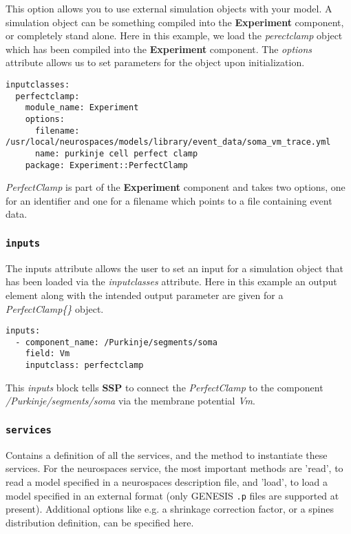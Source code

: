 \documentclass[12pt]{article}
\begin{document}
This option allows you to use external simulation objects with your model. A simulation object can be something compiled into the {\bf Experiment} component, or completely stand alone. Here in this example, we load the {\it perectclamp} object which has been compiled into the {\bf Experiment} component. The {\it options} attribute allows us to set parameters for the object upon initialization. 

\begin{verbatim}
inputclasses:
  perfectclamp:
    module_name: Experiment
    options:
      filename: /usr/local/neurospaces/models/library/event_data/soma_vm_trace.yml
      name: purkinje cell perfect clamp
    package: Experiment::PerfectClamp
\end{verbatim}

{\it PerfectClamp} is part of the {\bf Experiment} component and takes two options, one for an identifier and one for a filename which points to a file containing event data.

\subsubsection*{\tt inputs}

The inputs attribute allows the user to set an input for a simulation object that has been loaded via the {\it inputclasses} attribute. Here in this example an output element along with the intended output parameter are given for a {\it PerfectClamp\{\}} object.

\begin{verbatim}
inputs:
  - component_name: /Purkinje/segments/soma
    field: Vm
    inputclass: perfectclamp
\end{verbatim}

This {\it inputs} block tells {\bf SSP} to connect the {\it PerfectClamp} to the component {\it /Purkinje/segments/soma}
 via the membrane potential {\it Vm}.

\subsubsection*{\tt services}

    Contains a definition of all the services, and the method to instantiate these services. For the neurospaces service, the most important methods are 'read', to read a model specified in a neurospaces description file, and 'load', to load a model specified in an external format (only GENESIS {\tt .p} files are supported at present). Additional options like e.g. a shrinkage correction factor, or a spines distribution definition, can be specified here. 
\end{document}
